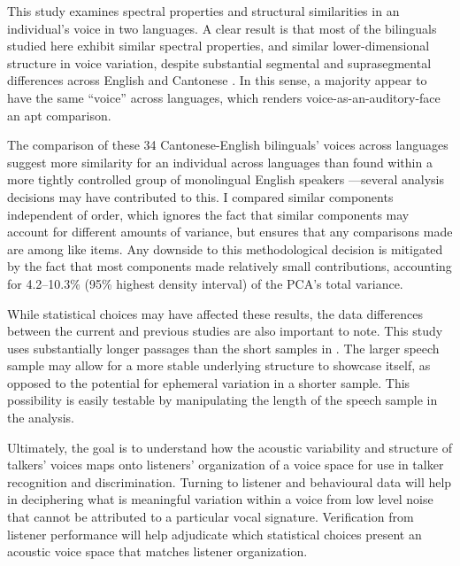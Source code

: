 





This study examines spectral properties and structural similarities in an individual's voice in two languages. A clear result is that most of the bilinguals studied here exhibit similar spectral properties, and similar lower-dimensional structure in voice variation, despite substantial segmental and suprasegmental differences across English and Cantonese \citep{matthews_2013_cantonese}. In this sense, a majority appear to have the same ``voice'' across languages, which renders voice-as-an-auditory-face an apt comparison.

The comparison of these 34 Cantonese-English bilinguals' voices across languages suggest more similarity for an individual across languages than found within a more tightly controlled group of monolingual English speakers \citep{lee_2019_acoustic}---several analysis decisions may have contributed to this. I compared similar components independent of order, which ignores the fact that similar components may account for different amounts of variance, but ensures that any comparisons made are among like items. Any downside to this methodological decision is mitigated by the fact that most components made relatively small contributions, accounting for 4.2--10.3\% (95\% highest density interval) of the PCA's total variance. 

While statistical choices may have affected these results, the data differences between the current and previous studies are also important to note. This study uses substantially longer passages than the short samples in \citet{lee_2019_acoustic}. The larger speech sample may allow for a more stable underlying structure to showcase itself, as opposed to the potential for ephemeral variation in a shorter sample. This possibility is easily testable by manipulating the length of the speech sample in the analysis.

Ultimately, the goal is to understand how the acoustic variability and structure of talkers' voices maps onto listeners' organization of a voice space for use in talker recognition and discrimination. Turning to listener and behavioural data will help in deciphering what is meaningful variation within a voice from low level noise that cannot be attributed to a particular vocal signature. Verification from listener performance will help adjudicate which statistical choices present an acoustic voice space that matches listener organization. 

\endinput %
